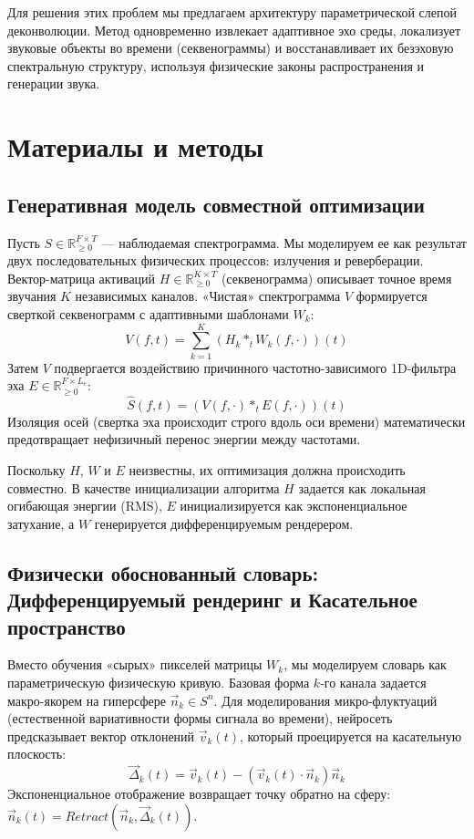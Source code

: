 \documentclass[11pt,a4paper]{article}
\begin{document}
Для решения этих проблем мы предлагаем архитектуру параметрической слепой деконволюции. Метод одновременно извлекает адаптивное эхо среды, локализует звуковые объекты во времени (секвенограммы) и восстанавливает их безэховую спектральную структуру, используя физические законы распространения и генерации звука.

\section{Материалы и методы}

\subsection{Генеративная модель совместной оптимизации}
Пусть $S \in \mathbb{R}_{\ge 0}^{F \times T}$ — наблюдаемая спектрограмма. Мы моделируем ее как результат двух последовательных физических процессов: излучения и реверберации.
Вектор-матрица активаций $H \in \mathbb{R}_{\ge 0}^{K \times T}$ (секвенограмма) описывает точное время звучания $K$ независимых каналов. «Чистая» спектрограмма $V$ формируется сверткой секвенограмм с адаптивными шаблонами $W_k$:
\begin{equation}
V(f, t) = \sum_{k=1}^{K} (H_k *_{t} W_k(f, \cdot))(t)
\end{equation}
Затем $V$ подвергается воздействию причинного частотно-зависимого 1D-фильтра эха $E \in \mathbb{R}_{\ge 0}^{F \times L_e}$:
\begin{equation}
\hat{S}(f, t) = (V(f, \cdot) *_{t} E(f, \cdot))(t)
\end{equation}
Изоляция осей (свертка эха происходит строго вдоль оси времени) математически предотвращает нефизичный перенос энергии между частотами.

Поскольку $H$, $W$ и $E$ неизвестны, их оптимизация должна происходить совместно. В качестве инициализации алгоритма $H$ задается как локальная огибающая энергии (RMS), $E$ инициализируется как экспоненциальное затухание, а $W$ генерируется дифференцируемым рендерером.

\subsection{Физически обоснованный словарь: Дифференцируемый рендеринг и Касательное пространство}
Вместо обучения «сырых» пикселей матрицы $W_k$, мы моделируем словарь как параметрическую физическую кривую. Базовая форма $k$-го канала задается макро-якорем на гиперсфере $\vec{n}_k \in S^n$. Для моделирования микро-флуктуаций (естественной вариативности формы сигнала во времени), нейросеть предсказывает вектор отклонений $\vec{v}_k(t)$, который проецируется на касательную плоскость:
\begin{equation}
\vec{\Delta}_k(t) = \vec{v}_k(t) - (\vec{v}_k(t) \cdot \vec{n}_k)\vec{n}_k
\end{equation}
Экспоненциальное отображение возвращает точку обратно на сферу: $\vec{n}_k(t) = Retract(\vec{n}_k, \vec{\Delta}_k(t))$.
\end{document}
